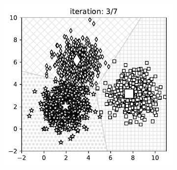 \begin{figure}[t]
\begin{subfigure}{0.325\textwidth}
    \end{subfigure}
    \begin{subfigure}{0.325\textwidth}
    \includegraphics[width=0.99\linewidth]{ebookML_src/src/kmeans/ex_2.pdf}
    \end{subfigure}


\end{figure}
